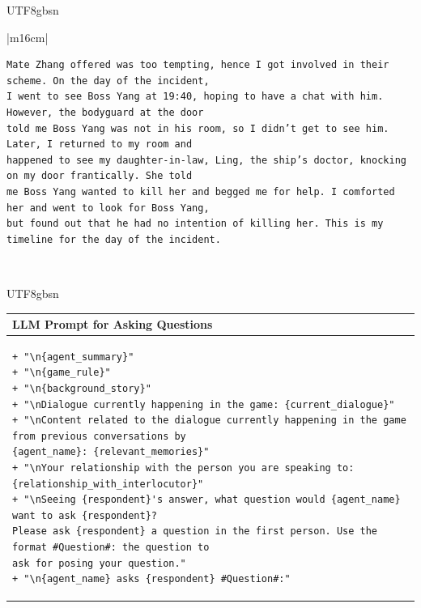 \documentclass[11pt]{article}
\begin{document}
{\begin{CJK}{UTF8}{gbsn}
\begin{table}[ht!]
\begin{minipage}[t]{\linewidth}
\begin{tabular}{|m{16cm}|}
\begin{verbatim}
Mate Zhang offered was too tempting, hence I got involved in their scheme. On the day of the incident, 
I went to see Boss Yang at 19:40, hoping to have a chat with him. However, the bodyguard at the door 
told me Boss Yang was not in his room, so I didn’t get to see him. Later, I returned to my room and
happened to see my daughter-in-law, Ling, the ship’s doctor, knocking on my door frantically. She told
me Boss Yang wanted to kill her and begged me for help. I comforted her and went to look for Boss Yang,
but found out that he had no intention of killing her. This is my timeline for the day of the incident.
\end{verbatim} \\
\hline
\end{tabular}
\end{minipage}

\caption{LLM prompt and output for answering questions. ( English Translation)}
\label{table:prompt_answer_questions_eng}
\end{table}
\end{CJK}

\begin{CJK}{UTF8}{gbsn}
\begin{table}[ht!]
\centering
\begin{minipage}[t]{\linewidth}
\begin{tabular}{|m{16cm}|}
\hline
\rowcolor{lightgray}  \textbf{LLM Prompt for Asking Questions}  \\
\hline
\small\begin{verbatim}
+ "\n{agent_summary}"
+ "\n{game_rule}"
+ "\n{background_story}"
+ "\nDialogue currently happening in the game: {current_dialogue}"
+ "\nContent related to the dialogue currently happening in the game from previous conversations by 
{agent_name}: {relevant_memories}"
+ "\nYour relationship with the person you are speaking to: {relationship_with_interlocutor}"
+ "\nSeeing {respondent}'s answer, what question would {agent_name} want to ask {respondent}? 
Please ask {respondent} a question in the first person. Use the format #Question#: the question to 
ask for posing your question."
+ "\n{agent_name} asks {respondent} #Question#:"
\end{verbatim}
\end{tabular}
\end{minipage}


\end{table}
\end{CJK}}
\end{document}
